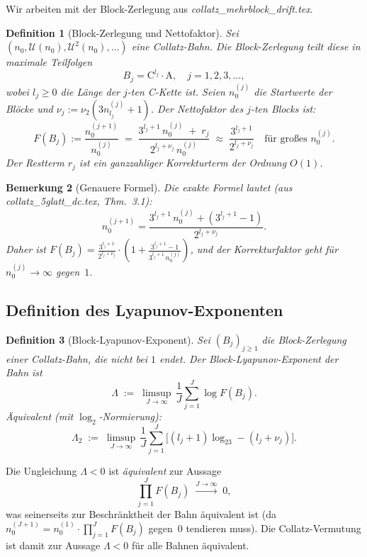 \documentclass[12pt,a4paper]{article}
\newtheorem{definition}{Definition}[section]
\newtheorem{bemerkung}[definition]{Bemerkung}
\newcommand{\vii}{\nu_2}
\newcommand{\U}{\mathcal{U}}
\newcommand{\logt}{\log_2}        %
\begin{document}
Wir arbeiten mit der Block-Zerlegung aus
\textit{collatz\_mehrblock\_drift.tex}.

\begin{definition}[Block-Zerlegung und Nettofaktor]
\label{def:block}
Sei $(n_0, \U(n_0), \U^2(n_0), \ldots)$ eine Collatz-Bahn. Die
\emph{Block-Zerlegung} teilt diese in maximale Teilfolgen
\[
  B_j = \mathrm{C}^{l_j}\!\cdot\mathrm{A}, \quad j = 1, 2, 3, \ldots,
\]
wobei $l_j \geq 0$ die Länge der $j$-ten C-Kette ist. Seien
$n_0^{(j)}$ die Startwerte der Blöcke und $\nu_j := \vii(3n_{l_j}^{(j)}+1)$.
Der \emph{Nettofaktor} des $j$-ten Blocks ist:
\[
  F(B_j) := \frac{n_0^{(j+1)}}{n_0^{(j)}}
  \;=\; \frac{3^{l_j+1}\,n_0^{(j)} \;+\; r_j}{2^{l_j+\nu_j}\,n_0^{(j)}}
  \;\approx\; \frac{3^{l_j+1}}{2^{l_j+\nu_j}}
  \quad\text{für großes }n_0^{(j)}.
\]
Der Restterm $r_j$ ist ein ganzzahliger Korrekturterm der Ordnung $O(1)$.
\end{definition}

\begin{bemerkung}[Genauere Formel]
Die exakte Formel lautet (aus \textit{collatz\_5glatt\_dc.tex},
Thm.~3.1):
\[
  n_0^{(j+1)} = \frac{3^{l_j+1}\,n_0^{(j)} + (3^{l_j+1}-1)}{2^{l_j+\nu_j}}.
\]
Daher ist $F(B_j) = \frac{3^{l_j+1}}{2^{l_j+\nu_j}}\cdot\!\left(1 + \frac{3^{l_j+1}-1}{3^{l_j+1}\,n_0^{(j)}}\right)$,
und der Korrekturfaktor geht für $n_0^{(j)} \to \infty$ gegen~$1$.
\end{bemerkung}

\subsection{Definition des Lyapunov-Exponenten}

\begin{definition}[Block-Lyapunov-Exponent]
\label{def:lyapunov}
Sei $(B_j)_{j \geq 1}$ die Block-Zerlegung einer Collatz-Bahn, die nicht
bei $1$ endet. Der \emph{Block-Lyapunov-Exponent} der Bahn ist
\[
  \Lambda \;:=\; \limsup_{J\to\infty}\,
    \frac{1}{J}\sum_{j=1}^{J} \log F(B_j).
\]
Äquivalent (mit $\log_2$-Normierung):
\[
  \Lambda_2 \;:=\; \limsup_{J\to\infty}\,
    \frac{1}{J}\sum_{j=1}^{J}
    \bigl[(l_j+1)\logt 3 - (l_j + \nu_j)\bigr].
\]
\end{definition}

\begin{tcolorbox}[kernidee, title={Äquivalenz zum Mehrblock-Drift-Kriterium}]
Die Ungleichung $\Lambda < 0$ ist \emph{äquivalent} zur Aussage
\[
  \prod_{j=1}^{J} F(B_j) \;\xrightarrow{J\to\infty}\; 0,
\]
was seinerseits zur Beschränktheit der Bahn äquivalent ist (da
$n_0^{(J+1)} = n_0^{(1)} \cdot \prod_{j=1}^J F(B_j)$ gegen~$0$ tendieren
muss). Die Collatz-Vermutung ist damit zur Aussage $\Lambda < 0$ für alle
Bahnen äquivalent.
\end{tcolorbox}
\end{document}
